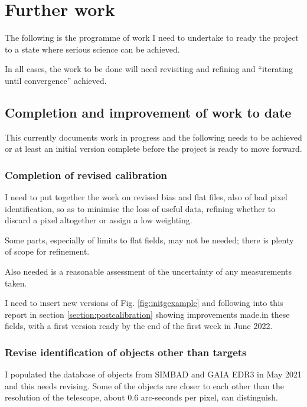 \section{Further work}
\protect\label{section:worktocome}

The following is the programme of work I need to undertake to ready the project
to a state where serious science can be achieved.

In all cases, the work to be done will need revisiting and refining and
``iterating until convergence'' achieved.

\subsection{Completion and improvement of work to date}
\protect\label{section:fwimprovecompletion}

This currently documents work in progress and the following needs to be achieved
or at least an initial version complete before the project is ready to move
forward.

\subsubsection{Completion of revised calibration}
\protect\label{section:fwcalib}

I need to put together the work on revised bias and flat files, also of bad
pixel identification, so as to minimise the loss of useful data, refining whether
to discard a pixel altogether or assign a low weighting.

Some parts, especially of limits to flat fields, may not be needed; there is
plenty of scope for refinement.

Also needed is a reasonable assessment of the uncertainty of any measurements
taken.

I need to insert new versions of Fig. \ref{fig:initgexample} and following
into this report in section \ref{section:postcalibration} showing improvements
made.in these fields, with a first version ready by the end of the first week in
June 2022.

\subsubsection{Revise identification of objects other than targets}
\protect\label{section:fwtargets}

I populated the database of objects from SIMBAD and GAIA EDR3 in May 2021 and
this needs revising. Some of the objects are closer to each other than the
resolution of the telescope, about 0.6 arc-seconds per pixel, can distinguish.


